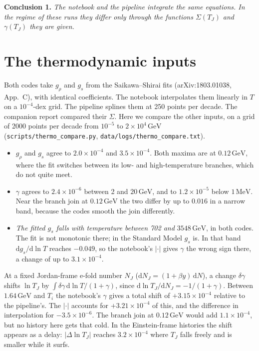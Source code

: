 \documentclass[11pt,a4paper]{article}
\newcommand{\TJ}{T_{J}}
\newcommand{\GeV}{\,\mathrm{GeV}}
\newcommand{\code}[1]{\texttt{#1}}
\begin{document}
\medskip\noindent
\textbf{Conclusion 1.} \emph{The notebook and the pipeline integrate the same equations. In
the regime of these runs they differ only through the functions $\Sigma(\TJ)$ and
$\gamma(\TJ)$ they are given.}

\section{The thermodynamic inputs}
\label{sec:thermo}

Both codes take $g_\rho$ and $g_s$ from the Saikawa--Shirai fits (arXiv:1803.01038,
App.~C), with identical coefficients. The notebook interpolates them linearly in $T$ on a
$10^{-4}$-dex grid. The pipeline splines them at 250 points per decade. The companion report
compared their $\Sigma$. Here we compare the other inputs, on a grid of 2000 points per decade
from $10^{-5}$ to $2\times10^4\GeV$ (\code{scripts/thermo\_compare.py},
\code{data/logs/thermo\_compare.txt}).
\begin{itemize}
\item $g_\rho$ and $g_s$ agree to $2.0\times10^{-4}$ and $3.5\times10^{-4}$. Both maxima
  are at $0.12\GeV$, where the fit switches between its low- and high-temperature branches,
  which do not quite meet.
\item $\gamma$ agrees to $2.4\times10^{-6}$ between 2 and $20\GeV$, and to $1.2\times10^{-5}$
  below $1\,\mathrm{MeV}$. Near the branch join at $0.12\GeV$ the two differ by up to
  $0.016$ in a narrow band, because the codes smooth the join differently.
\item \emph{The fitted $g_s$ falls with temperature between 702 and $3548\GeV$}, in both
  codes. The fit is not monotonic there; in the Standard Model $g_s$ is. In that band
  $\mathrm{d}g_s/\mathrm{d}\ln T$ reaches $-0.049$, so the notebook's $|\cdot|$ gives $\gamma$
  the wrong sign there, a change of up to $3.1\times10^{-4}$.
\end{itemize}
At a fixed Jordan-frame e-fold number $N_J$ ($\mathrm{d}N_J = (1+\beta y)\,\mathrm{d}N$), a change
$\delta\gamma$ shifts $\ln\TJ$ by $\int\delta\gamma\,\mathrm{d}\ln T/(1+\gamma)$, since
$\mathrm{d}\ln\TJ/\mathrm{d}N_J = -1/(1+\gamma)$.
Between $1.64\GeV$ and $T_i$ the notebook's $\gamma$ gives a total shift of $+3.15\times10^{-4}$
relative to the pipeline's. The $|\cdot|$ accounts for $+3.21\times10^{-4}$ of this, and the
difference in interpolation for $-3.5\times10^{-6}$. The branch join at $0.12\GeV$ would add
$1.1\times10^{-4}$, but no history here gets that cold. In the Einstein-frame histories the shift
appears as a delay: $|\Delta\ln\TJ|$ reaches $3.2\times10^{-4}$ where $\TJ$ falls freely and is
smaller while it surfs.
\end{document}
